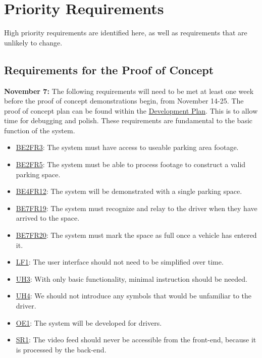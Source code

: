 \documentclass[12pt,letterpaper]{article}
\begin{document}
\newpage
\section{Priority Requirements}
\label{priorityreqs}
High priority requirements are identified here, as well as requirements that are unlikely to change.

\subsection{Requirements for the Proof of Concept}
\textbf{November 7:} The following requirements will need to be met at least one week before the proof of concept demonstrations begin, from November 14-25. The proof of concept plan can be found within the \href{https://github.com/parkd-app/park-d/blob/main/docs/DevelopmentPlan/DevelopmentPlan.pdf}
{Development Plan}. This is to allow time for debugging and polish. These requirements are fundamental to the basic function of the system.
\begin{itemize}
    \item \hyperref[poc1]{BE2FR3}: The system must have access to useable parking area footage.
    \item \hyperref[poc2]{BE2FR5}: The system must be able to process footage to construct a valid parking space.
    \item \hyperref[poc3]{BE4FR12}: The system will be demonstrated with a single parking space.
    \item \hyperref[poc4]{BE7FR19}: The system must recognize and relay to the driver when they have arrived to the space.
    \item \hyperref[poc5]{BE7FR20}: The system must mark the space as full once a vehicle has entered it.
    \item \hyperref[pocnf1]{LF1}: The user interface should not need to be simplified over time.
    \item \hyperref[pocnf2]{UH3}: With only basic functionality, minimal instruction should be needed.
    \item \hyperref[pocnf3]{UH4}: We should not introduce any symbols that would be unfamiliar to the driver.
    \item \hyperref[pocnf4]{OE1}: The system will be developed for drivers.
    \item \hyperref[pocnf5]{SR1}: The video feed should never be accessible from the front-end, because it is processed by the back-end.
\end{itemize}
\end{document}
